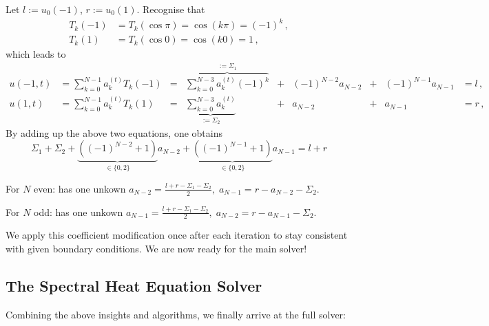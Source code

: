 \documentclass[12pt, a4paper]{article}
\begin{document}
  Let $l := u_0(-1)$, $r := u_0(1)$.
  Recognise that
  \begin{align*}
    T_k(-1) & = T_k(\cos \pi) = \cos(k \pi) = (-1)^k\,, \\
    T_k(1)  & = T_k(\cos 0) = \cos(k 0) = 1\,,
  \end{align*}
  which leads to
  \begin{align*}
    u(-1, t) & = \sum_{k=0}^{N-1} a_k^{(t)} T_k(-1) & = & \overbrace{\sum_{k=0}^{N-3} a_k^{(t)} (-1)^k}^{:= \Sigma_1} & + & (-1)^{N-2} a_{N-2} & + & (-1)^{N-1} a_{N-1} & = l\,, \\
    u(1, t)  & = \sum_{k=0}^{N-1} a_k^{(t)} T_k(1)  & = & \underbrace{\sum_{k=0}^{N-3} a_k^{(t)}}_{:= \Sigma_2}       & + & a_{N-2}            & + & a_{N-1}            & = r\,,
  \end{align*}
  By adding up the above two equations, one obtains
  \begin{equation}
    \Sigma_1 + \Sigma_2 + \underbrace{\left((-1)^{N-2} + 1\right)}_{\in \{0, 2\}} a_{N-2} + \underbrace{\left((-1)^{N-1} + 1\right)}_{\in \{0, 2\}} a_{N-1} = l + r \label{eq:boundary-equation}
  \end{equation}

  For $N$ even:  has one unkown $a_{N-2} = \frac{l+r-\Sigma_1-\Sigma_2}{2},\; a_{N-1} = r - a_{N-2} - \Sigma_2$.

  For $N$ odd:  has one unkown $a_{N-1} = \frac{l+r-\Sigma_1-\Sigma_2}{2},\; a_{N-2} = r - a_{N-1} - \Sigma_2$.

  We apply this coefficient modification once after each iteration to stay consistent with given boundary conditions.
  We are now ready for the main solver!

  \subsection{The Spectral Heat Equation Solver}
  Combining the above insights and algorithms, we finally arrive at the full solver:
\end{document}
